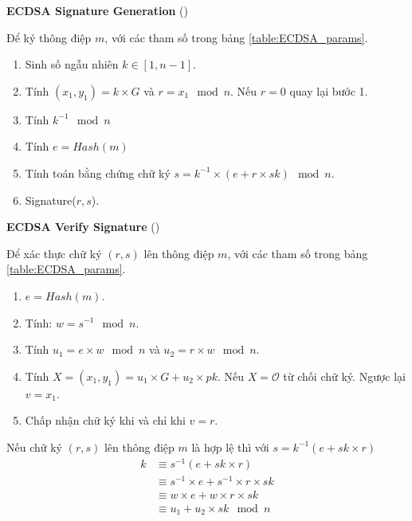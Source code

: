 \documentclass[../main.tex]{subfiles}
\begin{document}
\textbf{ECDSA Signature Generation} (\cite{johnson2001elliptic})


Để ký thông điệp $m$, với các tham số trong bảng \ref{table:ECDSA_params}.
\begin{enumerate}
    \item Sinh số ngẫu nhiên $k \in [1,n-1]$.
    \item Tính $(x_1, y_1) = k \times G$ và $r = x_1 \mod n$. Nếu $r = 0$ quay lại bước 1.
    \item Tính $k^{-1} \mod n$
    \item Tính $e = Hash(m)$
    \item Tính toán bằng chứng chữ ký $s = k^{-1}\times (e+r\times sk)\mod n$.
    \item Signature($r,s$).
\end{enumerate}

\textbf{ECDSA Verify Signature} (\cite{johnson2001elliptic})


Để xác thực chữ ký $(r,s)$ lên thông điệp $m$, với các tham số trong bảng \ref{table:ECDSA_params}.
\begin{enumerate}
    \item $e = Hash(m)$.
    \item Tính: $w = s^{-1} \mod{n}$.
    \item Tính $u_1 = e\times w\mod n$ và $u_2 = r\times w\mod n$.
    \item Tính $X = (x_1,y_1) = u_1\times G + u_2 \times pk$. Nếu $X = \mathcal{O}$ từ chối chữ ký. Ngược lại $v = x_1$.
    \item Chấp nhận chữ ký khi và chỉ khi $v = r$.
\end{enumerate}

Nếu chữ ký $(r,s)$ lên thông điệp $m$ là hợp lệ thì với $s = k^{-1}(e + sk \times r)$
\begin{align*}
    k   &\equiv s^{-1}(e+sk \times r)\\
        &\equiv s^{-1} \times e + s^{-1}\times r\times sk\\
        &\equiv w\times e + w \times r \times sk\\
        &\equiv u_1 + u_2 \times sk \mod n\\
\end{align*}
\end{document}
